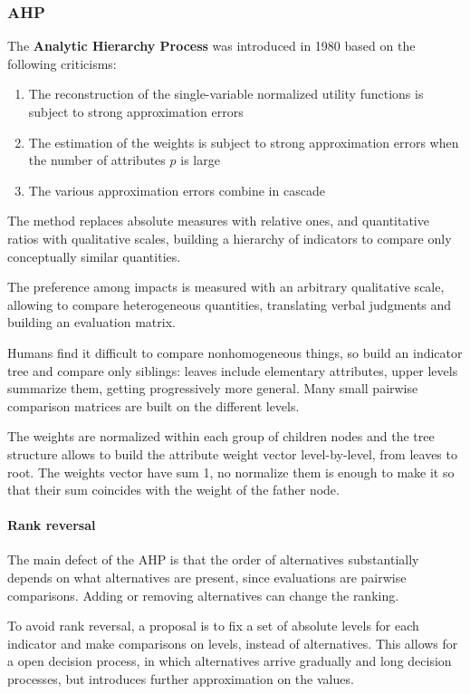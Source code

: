 \subsubsection{AHP}

The \textbf{Analytic Hierarchy Process} was introduced in 1980 based on the following criticisms:
\begin{enumerate}
	\item The reconstruction of the single-variable normalized utility functions is subject to strong approximation errors
	
	\item The estimation of the weights is subject to strong approximation errors when the number of attributes $p$ is large
	
	\item The various approximation errors combine in cascade
\end{enumerate}

The method replaces absolute measures with relative ones, and quantitative ratios with qualitative scales, building a hierarchy of indicators to compare only conceptually similar quantities.

The preference among impacts is measured with an arbitrary qualitative scale, allowing to compare heterogeneous quantities, translating verbal judgments and building an evaluation matrix. 

Humans find it difficult to compare nonhomogeneous things, so build an indicator tree and compare only siblings: leaves include elementary attributes, upper levels summarize them, getting progressively more general. Many small pairwise comparison matrices are built on the different levels.

The weights are normalized within each group of children nodes and the tree structure allows to build the attribute weight vector level-by-level, from leaves to root. The weights vector have sum 1, no normalize them is enough to make it so that their sum coincides with the weight of the father node.

\paragraph{Rank reversal} The main defect of the AHP is that the order of alternatives substantially depends on what alternatives are present, since evaluations are pairwise comparisons. Adding or removing alternatives can change the ranking.

To avoid rank reversal, a proposal is to fix a set of absolute levels for each indicator and make comparisons on levels, instead of alternatives. This allows for a open decision process, in which alternatives arrive gradually and long decision processes, but introduces further approximation on the values.

